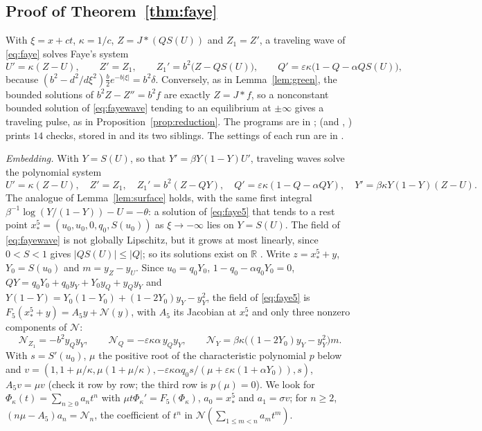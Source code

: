 \documentclass[11pt]{article}
\theoremstyle{definition}
\newcommand{\R}{\mathbb{R}}
\newcommand{\eps}{\varepsilon}
\newcommand{\xs}{x_*}
\begin{document}
\subsection{Proof of Theorem~\ref{thm:faye}}\label{sec:proof-faye}

With $\xi = x + ct$, $\kappa = 1/c$, $Z = J * (QS(U))$ and $Z_1 = Z'$, a traveling wave of \eqref{eq:faye} solves Faye's system \cite[eq.~(2.8)]{faye2013}
\begin{equation}\label{eq:fayewave}
  U' = \kappa(Z - U), \qquad Z' = Z_1, \qquad Z_1' = b^2\bigl(Z - QS(U)\bigr), \qquad Q' = \eps\kappa\bigl(1 - Q - \alpha QS(U)\bigr),
\end{equation}
because $(b^2 - d^2/d\xi^2)\frac b2 e^{-b|\xi|} = b^2\delta$. Conversely, as in Lemma~\ref{lem:green}, the bounded solutions of $b^2Z - Z'' = b^2 f$ are exactly $Z = J * f$, so a nonconstant bounded solution of \eqref{eq:fayewave} tending to an equilibrium at $\pm\infty$ gives a traveling pulse, as in Proposition~\ref{prop:reduction}. The programs are in ;  (and , ) prints $14$ checks, stored in  and its two siblings. The settings of each run are in .

\emph{Embedding.} With $Y = S(U)$, so that $Y' = \beta Y(1 - Y)U'$, traveling waves solve the polynomial system
\begin{equation}\label{eq:faye5}
  U' = \kappa(Z - U), \quad Z' = Z_1, \quad Z_1' = b^2(Z - QY), \quad Q' = \eps\kappa(1 - Q - \alpha QY), \quad Y' = \beta\kappa Y(1 - Y)(Z - U).
\end{equation}
The analogue of Lemma~\ref{lem:surface} holds, with the same first integral $\beta^{-1}\log(Y/(1 - Y)) - U = -\theta$: a solution of \eqref{eq:faye5} that tends to a rest point $\xs^5 = (u_0, u_0, 0, q_0, S(u_0))$ as $\xi \to -\infty$ lies on $Y = S(U)$. The field of \eqref{eq:fayewave} is not globally Lipschitz, but it grows at most linearly, since $0 < S < 1$ gives $|QS(U)| \le |Q|$; so its solutions exist on $\R$ \cite[Theorem~2.17]{teschl2012}. Write $z = \xs^5 + y$, $Y_0 = S(u_0)$ and $m = y_Z - y_U$. Since $u_0 = q_0Y_0$, $1 - q_0 - \alpha q_0Y_0 = 0$, $QY = q_0Y_0 + q_0y_Y + Y_0y_Q + y_Qy_Y$ and $Y(1 - Y) = Y_0(1 - Y_0) + (1 - 2Y_0)y_Y - y_Y^2$, the field of \eqref{eq:faye5} is $F_5(\xs^5 + y) = A_5y + \mathcal{N}(y)$, with $A_5$ its Jacobian at $\xs^5$ and only three nonzero components of $\mathcal{N}$:
\[
  \mathcal{N}_{Z_1} = -b^2y_Qy_Y, \qquad \mathcal{N}_Q = -\eps\kappa\alpha\, y_Qy_Y, \qquad \mathcal{N}_Y = \beta\kappa\bigl((1 - 2Y_0)y_Y - y_Y^2\bigr)m .
\]
With $s = S'(u_0)$, $\mu$ the positive root of the characteristic polynomial $p$ below and $v = (1, 1 + \mu/\kappa, \mu(1 + \mu/\kappa), -\eps\kappa\alpha q_0s/(\mu + \eps\kappa(1 + \alpha Y_0)), s)$, $A_5v = \mu v$ (check it row by row; the third row is $p(\mu) = 0$). We look for $\Phi_\kappa(t) = \sum_{n \ge 0}a_nt^n$ with $\mu t\Phi_\kappa' = F_5(\Phi_\kappa)$, $a_0 = \xs^5$ and $a_1 = \sigma v$; for $n \ge 2$, $(n\mu - A_5)a_n = \mathcal{N}_n$, the coefficient of $t^n$ in $\mathcal{N}(\sum_{1 \le m < n}a_mt^m)$.
\end{document}
